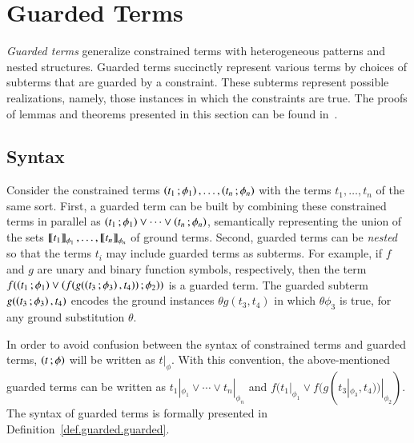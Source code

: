 
\section{Guarded Terms}
\label{sec.guarded}

\emph{Guarded terms} generalize constrained terms with heterogeneous
patterns and nested structures. %
Guarded terms %
succinctly represent various terms by choices of subterms that are
guarded by a constraint.
These subterms represent possible realizations, namely,
those instances in which the constraints are true. The proofs of
lemmas and theorems presented in this section can be found
in~\cite{bae-noteguardedterms-2017}.


\subsection{Syntax}

Consider the constrained terms
$\left( t_1 \,; \phi_1 \right),\ldots,\left( t_n \,; \phi_n \right)$ with the terms
$t_1,\ldots,t_n$ of the same sort.  First, a guarded term can be built
by combining these constrained terms in parallel as
$\left( t_1 \,; \phi_1 \right) \lor \cdots \lor \left( t_n \,; \phi_n \right)$, semantically
representing the union of the sets
$\left\llbracket t_1 \right\rrbracket_{\phi_1},\ldots,\left\llbracket t_n \right\rrbracket_{\phi_n}$ of ground terms. 
%
 Second, guarded terms
can be \emph{nested} so that the terms $t_i$ may include guarded terms
as subterms. For example, if $f$ and $g$ are unary and
binary function symbols, respectively, then the term 
$f(\left( t_1 \,; \phi_1 \right) \lor
\left( f(g(\left( t_3 \,; \phi_3 \right), t_4)) \,; \phi_2 \right))$ is a guarded term.  The
guarded subterm $g(\left( t_3 \,; \phi_3 \right), t_4)$ encodes the ground
instances $\theta g(t_3,t_4)$ in which $\theta\phi_3$ is true, for any
ground substitution $\theta$.

In order to avoid confusion between the syntax of constrained terms
and guarded terms, %
$\left( t \,; \phi \right)$ will be written as
$t |_\phi$. With this convention, the above-mentioned guarded terms
can be written as $t_1 |_{\phi_1} \lor \cdots \lor t_n |_{\phi_n}$ and
$f(t_1 |_{\phi_1} \lor f(g(t_3 |_{\phi_3}, t_4)) |_{\phi_2})$.
%
The syntax of guarded terms is formally presented in
Definition~\ref{def.guarded.guarded}.

